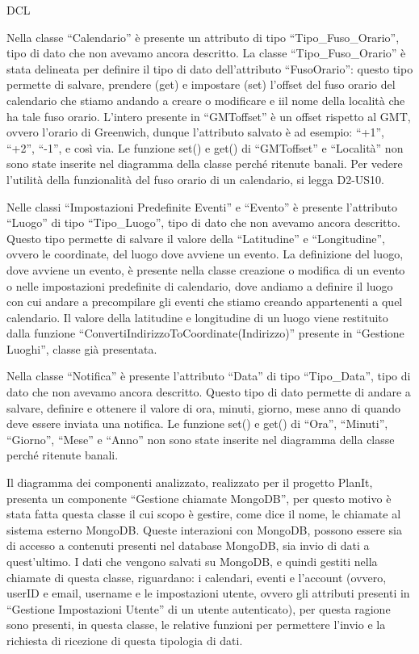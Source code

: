 \begin{listaPersonale}{DCL}

    Nella classe “Calendario” è presente un attributo di tipo “Tipo\_Fuso\_Orario”, tipo di dato che non avevamo ancora descritto. La classe “Tipo\_Fuso\_Orario” è stata delineata per definire il tipo di dato dell'attributo “FusoOrario”: questo tipo permette di salvare, prendere (get) e impostare (set) l'offset del fuso orario del calendario che stiamo andando a creare o modificare e iil nome della località che ha tale fuso orario. L'intero presente in “GMToffset” è un offset rispetto al GMT, ovvero l'orario di Greenwich, dunque l'attributo salvato è ad esempio: “+1”, “+2”, “-1”, e così via. Le funzione set() e get() di “GMToffset” e “Località” non sono state inserite nel diagramma della classe perché ritenute banali. Per vedere l'utilità della funzionalità del fuso orario di un calendario, si legga D2-US10.


    Nelle classi “Impostazioni Predefinite Eventi” e “Evento” è presente l'attributo “Luogo” di tipo “Tipo\_Luogo”, tipo di dato che non avevamo ancora descritto. Questo tipo permette di salvare il valore della “Latitudine” e “Longitudine”, ovvero le coordinate, del luogo dove avviene un evento. La definizione del luogo, dove avviene un evento, è presente nella classe creazione o modifica di un evento o nelle impostazioni predefinite di calendario, dove andiamo a definire il luogo con cui andare a precompilare gli eventi che stiamo creando appartenenti a quel calendario. Il valore della latitudine e longitudine di un luogo viene restituito dalla funzione “ConvertiIndirizzoToCoordinate(Indirizzo)” presente in “Gestione Luoghi”, classe già presentata.


    Nella classe “Notifica” è presente l'attributo “Data” di tipo “Tipo\_Data”, tipo di dato che non avevamo ancora descritto. Questo tipo di dato permette di andare a salvare, definire e ottenere il valore di ora, minuti, giorno, mese anno di quando deve essere inviata una notifica. Le funzione set() e get() di “Ora”, “Minuti”, “Giorno”, “Mese” e “Anno” non sono state inserite nel diagramma della classe perché ritenute banali.

    Il diagramma dei componenti analizzato, realizzato per il progetto PlanIt, presenta un componente “Gestione chiamate MongoDB”, per questo motivo è stata fatta questa classe il cui scopo è gestire, come dice il nome, le chiamate al sistema esterno MongoDB. Queste interazioni con MongoDB, possono essere sia di accesso a contenuti presenti nel database MongoDB, sia invio di dati a quest'ultimo. I dati che vengono salvati su MongoDB, e quindi gestiti nella chiamate di questa classe, riguardano: i calendari, eventi e l'account (ovvero, userID e email, username e le impostazioni utente, ovvero gli attributi presenti in “Gestione Impostazioni Utente” di un utente autenticato), per questa ragione sono presenti, in questa classe, le relative funzioni per permettere l'invio e la richiesta di ricezione di questa tipologia di dati.


\end{listaPersonale}
